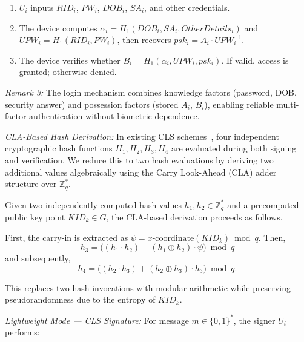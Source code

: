 \documentclass[conference]{IEEEtran}
\begin{document}
\begin{enumerate}
\item $U_i$ inputs $RID_i$, $PW_i$, $DOB_i$, $SA_i$, and other credentials.

\item The device computes $\alpha_i = H_1(DOB_i, SA_i, OtherDetails_i)$ and $UPW_i = H_1(RID_i, PW_i)$, then recovers $psk_i = A_i \cdot UPW_i^{-1}$.

\item The device verifies whether $B_i = H_1(\alpha_i, UPW_i, psk_i)$. If valid, access is granted; otherwise denied.
\end{enumerate}

\textit{Remark 3:} The login mechanism combines knowledge factors (password, DOB, security answer) and possession factors (stored $A_i$, $B_i$), enabling reliable multi-factor authentication without biometric dependence.

\vspace{0.5em}

\noindent\textit{CLA-Based Hash Derivation:} In existing CLS schemes~\cite{ref24}, four independent cryptographic hash functions $H_1, H_2, H_3, H_4$ are evaluated during both signing and verification. We reduce this to two hash evaluations by deriving two additional values algebraically using the Carry Look-Ahead (CLA) adder structure over $\mathbb{Z}_q^*$.

Given two independently computed hash values $h_1, h_2 \in \mathbb{Z}_q^*$ and a precomputed public key point $KID_k \in G$, the CLA-based derivation proceeds as follows.

First, the carry-in is extracted as $\psi = x\text{-coordinate}(KID_k) \bmod q$. Then,
\begin{equation}
h_3 = \big((h_1 \cdot h_2) + (h_1 \oplus h_2)\cdot \psi\big) \bmod q \tag{2}
\end{equation}
and subsequently,
\begin{equation}
h_4 = \big((h_2 \cdot h_3) + (h_2 \oplus h_3)\cdot h_3\big) \bmod q. \tag{3}
\end{equation}

This replaces two hash invocations with modular arithmetic while preserving pseudorandomness due to the entropy of $KID_k$.

\vspace{0.5em}

\noindent\textit{Lightweight Mode — CLS Signature:} For message $m \in \{0,1\}^*$, the signer $U_i$ performs:
\end{document}
